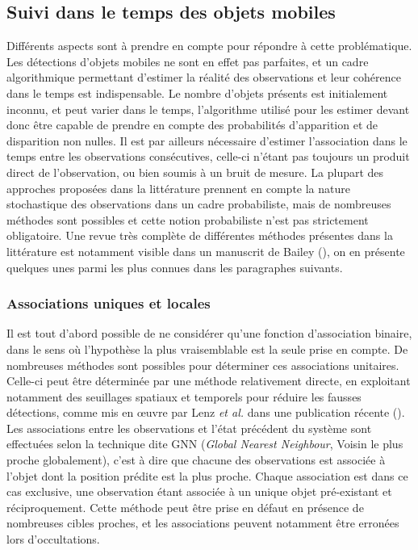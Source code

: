 \subsection{Suivi dans le temps des objets mobiles} \label{sec:ch2_suivi_objets_mobiles}
Différents aspects sont à prendre en compte pour répondre à cette problématique. Les détections d'objets mobiles ne sont en effet pas parfaites, et un cadre algorithmique permettant d'estimer la réalité des observations et leur cohérence dans le temps est indispensable. Le nombre d'objets présents est initialement inconnu, et peut varier dans le temps, l'algorithme utilisé pour les estimer devant donc être capable de prendre en compte des probabilités d'apparition et de disparition non nulles. Il est par ailleurs nécessaire d'estimer l'association dans le temps entre les observations consécutives, celle-ci n'étant pas toujours un produit direct de l'observation, ou bien soumis à un bruit de mesure. La plupart des approches proposées dans la littérature prennent en compte la nature stochastique des observations dans un cadre probabiliste, mais de nombreuses méthodes sont possibles et cette notion probabiliste n'est pas strictement obligatoire. Une revue très complète de différentes méthodes présentes dans la littérature est notamment visible dans un manuscrit de Bailey (\cite{Bailey2002}), on en présente quelques unes parmi les plus connues dans les paragraphes suivants.\\

\subsubsection{Associations uniques et locales}
Il est tout d'abord possible de ne considérer qu'une fonction d'association \og binaire\fg{}, dans le sens où l'hypothèse la plus vraisemblable est la seule prise en compte. De nombreuses méthodes sont possibles pour déterminer ces associations unitaires.\\
Celle-ci peut être déterminée par une méthode relativement directe, en exploitant notamment des seuillages spatiaux et temporels pour réduire les fausses détections, comme mis en œuvre par Lenz \textit{et al.} dans une publication récente (\cite{Lenz2011}). Les associations entre les observations et l'état précédent du système sont effectuées selon la technique dite GNN (\emph{Global Nearest Neighbour}, Voisin le plus proche globalement), c'est à dire que chacune des observations est associée à l'objet dont la position prédite est la plus proche. Chaque association est dans ce cas exclusive, une observation étant associée à un unique objet pré-existant et réciproquement. Cette méthode peut être prise en défaut en présence de nombreuses cibles proches, et les associations peuvent notamment être erronées lors d'occultations.\\
